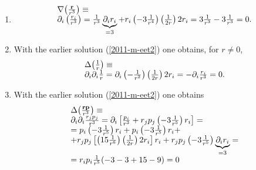 {\begin{enumerate}
\item
\begin{equation}
\begin{array}{l}
\nabla \bigl({{\bf r} \over r^3} \bigr)\equiv
\\  \partial_i\left(\frac{r_i}{r^3}\right)=
  \frac{1}{r^3}\underbrace{\partial_i r_i}_{=3}+
  r_i\left(-3\frac{1}{r^4}\right)\left(\frac{1}{2r}\right)2r_i=
  3\frac{1}{r^3}-3\frac{1}{r^3}=0 .
\end{array}
\label{2011-m-eet2}
\end{equation}


\item  With the earlier solution (\ref{2011-m-eet2}) one obtains, for $r \neq 0$,
\begin{equation}
\begin{array}{l}
\Delta \bigl({1 \over r} \bigr)\equiv
\\
  \partial_i\partial_i\frac{1}{r}=\partial_i\left(-\frac{1}{r^2}\right)
  \left(\frac{1}{2r}\right)2r_i=-\partial_i\frac{r_i}{r^3}=0   .
\end{array}
\end{equation}


\item  With the earlier solution (\ref{2011-m-eet2}) one obtains
\begin{equation}
\begin{array}{l}
\Delta \bigl({{\bf r} {\bf p} \over r^3} \bigr)\equiv \\
  \partial_i\partial_i\frac{r_jp_j}{r^3}=
    \partial_i
    \left[
      \frac{p_i}{r^3}+r_jp_j\left(-3\frac{1}{r^5}\right)r_i
    \right]= \\
  = p_i\left(-3\frac{1}{r^5}\right)r_i+
    p_i\left(-3\frac{1}{r^5}\right)r_i+ \\
   +r_jp_j
    \left[
      \left(15\frac{1}{r^6}\right)
      \left(\frac{1}{2r}\right)2r_i
    \right]r_i+
    r_jp_j\left(-3\frac{1}{r^5}\right)
    \underbrace{\partial_i r_i}_{=3}= \\
  = r_i p_i \frac{1}{r^5}(-3-3+15-9)=0
\end{array}
\end{equation}




\end{enumerate}}
